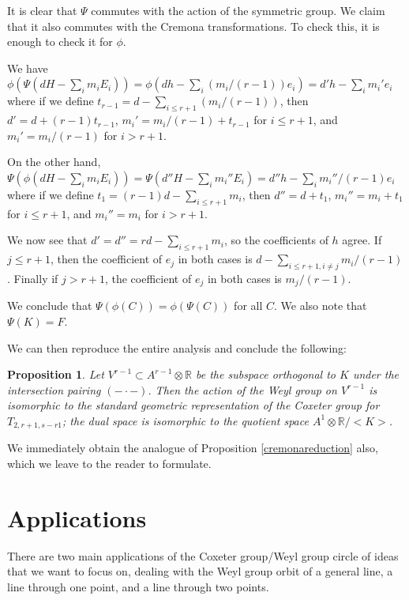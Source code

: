 \documentclass[12pt]{article}
\numberwithin{equation}{section}
\newtheorem{proposition}[equation]{Proposition}
\numberwithin{equation}{section}
\numberwithin{subeq}{equation}
\def\bbR{\mathbb{R}}
\begin{document}
It is clear that $\Psi$ commutes with the action of the symmetric group.
We claim that it also commutes with the Cremona transformations.
To check this, it is enough to check it for $\phi$.

We have
$\phi(\Psi(dH-\sum_i m_i E_i))
= \phi(dh - \sum_i (m_i/(r-1))e_i)
= d'h - \sum_i m_i' e_i$
where if we define $t_{r-1} = d-\sum_{i\leq r+1} (m_i/(r-1))$, then
$d' = d+(r-1)t_{r-1}$,
$m_i' = m_i/(r-1) + t_{r-1}$ for $i \leq r+1$, and
$m_i'= m_i/(r-1)$ for $i > r+1$.

On the other hand,
$\Psi(\phi(dH-\sum_i m_i E_i))
= \Psi(d''H - \sum_i m_i'' E_i)
= d''h - \sum_i m_i''/(r-1) e_i$
where if we define $t_1 = (r-1)d-\sum_{i \leq r+1} m_i$, then
$d'' = d+t_1$,
$m_i''=m_i+t_1$ for $i \leq r+1$, and
$m_i'' = m_i$ for $i > r+1$.

We now see that $d'=d'' = rd-\sum_{i \leq r+1} m_i$, so the coefficients of $h$ agree.
If $j \leq r+1$, then the coefficient of $e_j$ in both cases is
$d-\sum_{i \leq r+1, i \neq j} m_i/(r-1)$.
Finally if $j > r+1$, the coefficient of $e_j$ in both cases is
$m_j/(r-1)$.

We conclude that $\Psi(\phi(C)) = \phi(\Psi(C))$ for all $C$.
We also note that $\Psi(K) = F$.

We can then reproduce the entire analysis and conclude the following:
\begin{proposition}
Let $V^{r-1} \subset A^{r-1}\otimes\bbR$
be the subspace orthogonal to $K$ under the intersection pairing $(-\cdot -)$.
Then the action of the Weyl group on $V^{r-1}$ is isomorphic
to the standard geometric representation of the Coxeter group for $T_{2,r+1,s-r1}$;
the dual space is isomorphic to the quotient space $A^1\otimes\bbR/<K>$.
\end{proposition}

We immediately obtain the analogue of Proposition \ref{cremonareduction} also,
which we leave to the reader to formulate.



\section{Applications}\label{applications}
There are two main applications of the Coxeter group/Weyl group circle of ideas that we want to focus on, dealing with the Weyl group orbit of a general line, a line through one point, and a line through two points.
\end{document}
